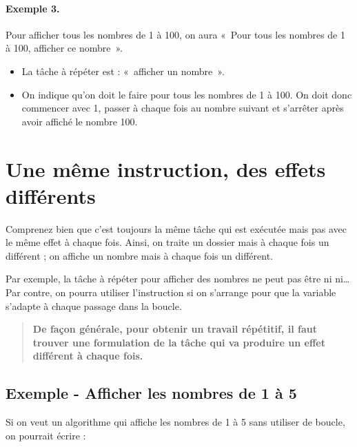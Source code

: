 	\paragraph{Exemple 3.}
	Pour afficher tous les nombres de 1 à 100, on aura
	«~Pour tous les nombres de 1 à 100, afficher ce nombre~».
	\begin{itemize}
	\item
		La tâche à répéter est : «~afficher un nombre~».
	\item 
		On indique qu’on doit le faire pour tous les nombres de 1 à 100. 
		On doit donc commencer avec 1, 
		passer à chaque fois au nombre suivant 
		et s’arrêter après avoir affiché le nombre 100.
	\end{itemize}
		
\section{Une même instruction, des effets différents}

	Comprenez bien que c’est toujours la même tâche qui est exécutée 
	mais pas avec le même effet à chaque fois. 
	Ainsi, on traite un dossier mais à chaque fois un différent ; 
	on affiche un nombre mais à chaque fois un différent. 
	
	Par exemple, la tâche à répéter pour afficher des nombres
	ne peut pas être
	 ni  ni\dots{}
	Par contre, on pourra utiliser l'instruction
	 si on s'arrange pour que la variable
	 s'adapte à chaque passage dans la boucle.

	\begin{quote}
		\bfseries
		De façon générale,
		pour obtenir un travail répétitif,
		il faut trouver une formulation de la tâche
		qui va produire un effet différent à chaque fois.
	\end{quote}
	
	\subsection{Exemple - Afficher les nombres de 1 à 5}
	
		Si on veut un algorithme qui affiche les nombres de 1 à 5
		sans utiliser de boucle, on pourrait écrire :
		
		\begin{LDA}
		\end{LDA}
		
